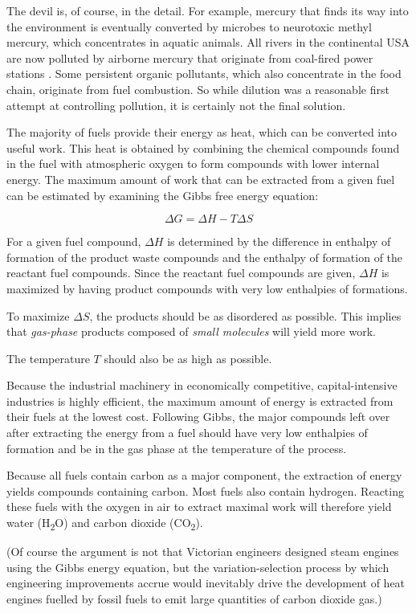 The devil is, of course, in the detail. For example, mercury that finds its way
into the environment is eventually converted by microbes to neurotoxic methyl
mercury, which concentrates in aquatic animals. All rivers in the continental
USA are now polluted by airborne mercury that originate from coal-fired power
stations \autocite{Wentz2014}. Some persistent organic pollutants, which also
concentrate in the food chain, originate from fuel combustion. So while dilution
was a reasonable first attempt at controlling pollution, it is certainly not the
final solution.

The majority of fuels provide their energy as heat, which can be converted into
useful work. This heat is obtained by combining the chemical compounds found in
the fuel with atmospheric oxygen to form compounds with lower internal energy.
The maximum amount of work that can be extracted from a given fuel can be
estimated by examining the Gibbs free energy equation:

\[
	\Delta G = \Delta H - T \Delta S
\]

For a given fuel compound, \(\Delta H\) is determined by the difference
in enthalpy of formation of the product waste compounds and the enthalpy of
formation of the reactant fuel compounds. Since the reactant fuel compounds are
given, \(\Delta H\) is maximized by having product compounds with very low
enthalpies of formations.

To maximize \(\Delta S\), the products should be as disordered as possible. This
implies that \emph{gas-phase} products composed of \emph{small molecules} will
yield more work.

The temperature \(T\) should also be as high as possible.

Because the industrial machinery in economically competitive, capital-intensive
industries is highly efficient, the maximum amount of energy is extracted from
their fuels at the lowest cost. Following Gibbs, the major compounds left over
after extracting the energy from a fuel should have very low enthalpies of
formation and be in the gas phase at the temperature of the process. 

Because all fuels contain carbon as a major component, the extraction of energy
yields compounds containing carbon. Most fuels also contain hydrogen. Reacting
these fuels with the oxygen in air to extract maximal work will therefore
yield water (H\textsubscript{2}O) and carbon dioxide (CO\textsubscript{2}). 

(Of course the argument is not that Victorian engineers designed steam engines
using the Gibbs energy equation, but the variation-selection process
\autocite[Chapter 8]{Vincenti1990} by which engineering improvements accrue would
inevitably drive the development of heat engines fuelled by fossil fuels to emit
large quantities of carbon dioxide gas.)

